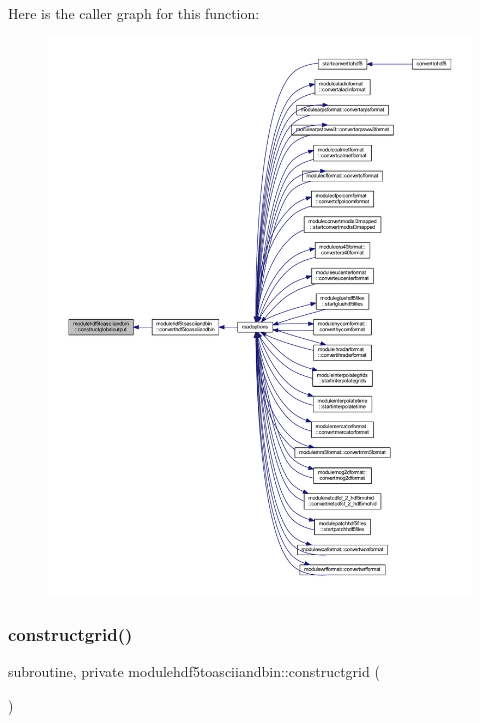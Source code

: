Here is the caller graph for this function\+:\nopagebreak
\begin{figure}[H]
\begin{center}
\leavevmode
\includegraphics[width=350pt]{namespacemodulehdf5toasciiandbin_ae2d0b8b9ab26e879bc85d79fd4815b5d_icgraph}
\end{center}
\end{figure}
\mbox{\label{namespacemodulehdf5toasciiandbin_aa5588d4c881fba9ebc04c57393f30c76}} 
\subsubsection{\texorpdfstring{constructgrid()}{constructgrid()}}
{\footnotesize\ttfamily subroutine, private modulehdf5toasciiandbin\+::constructgrid (\begin{DoxyParamCaption}{ }\end{DoxyParamCaption})\hspace{0.3cm}{\ttfamily [private]}}

